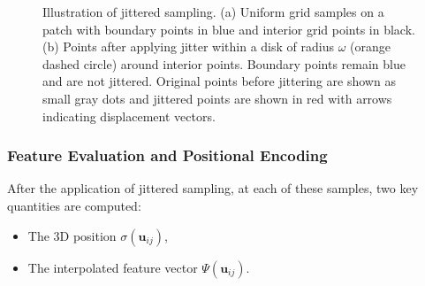 \begin{figure}[h!]
\begin{adjustbox}{center}
  \end{adjustbox}
  \caption{Illustration of jittered sampling. (a) Uniform grid samples on a patch with boundary points in blue and interior grid points in black. (b) Points after applying jitter within a disk of radius \(\omega\) (orange dashed circle) around interior points. Boundary points remain blue and are not jittered. Original points before jittering are shown as small gray dots and jittered points are shown in red with arrows indicating displacement vectors.}
  \label{fig:jittered-sampling}
\end{figure}

\subsubsection{Feature Evaluation and Positional Encoding}

After the application of jittered sampling, at each of these samples, two key quantities are computed:  
\begin{itemize}
  \item The 3D position $\sigma(\mathbf{u}_{ij})$,  
  \item The interpolated feature vector $\Psi(\mathbf{u}_{ij})$.  
\end{itemize}

